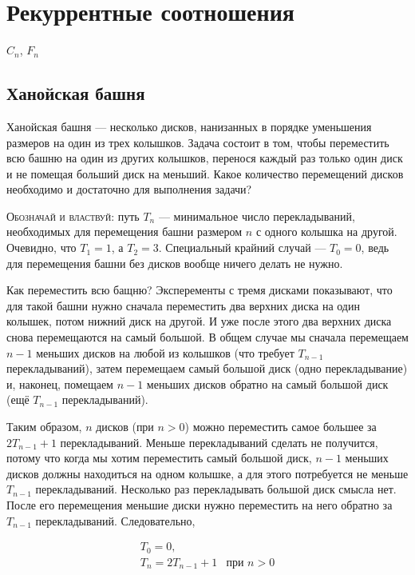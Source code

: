 \documentclass[14pt]{book}
\begin{document}
\begingroup
\hypersetup{linkcolor=black}
\tableofcontents
\endgroup

\clearpage

\chapter{Рекуррентные соотношения}

$C_n$, $F_n$

\section{Ханойская башня}

Ханойская башня --- несколько дисков, нанизанных в порядке уменьшения размеров на один из
трех колышков. Задача состоит в том, чтобы переместить всю башню на один из других колышков,
перенося каждый раз только один диск и не помещая больший диск на меньший.
Какое количество перемещений дисков необходимо и достаточно для выполнения задачи?

\textsc{Обозначай и властвуй}: путь $T_n$ --- минимальное число перекладываний, необходимых
для перемещения башни размером $n$ с одного колышка на другой. Очевидно, что $T_1=1$, а $T_2=3$.
Специальный крайний случай --- $T_0=0$, ведь для перемещения башни без дисков вообще ничего делать
не нужно.

Как переместить всю бащню? Эксперементы с тремя дисками показывают, что для такой башни нужно 
сначала переместить два верхних диска на один колышек, потом нижний диск на другой. И уже 
после этого два верхних диска снова перемещаются на самый большой. В общем случае мы сначала
перемещаем $n-1$ меньших дисков на любой из колышков (что требует $T_{n-1}$ перекладываний),
затем перемещаем самый большой диск (одно перекладывание) и, наконец, помещаем $n-1$
меньших дисков обратно на самый большой диск (ещё $T_{n-1}$ перекладываний). 

Таким образом, $n$ дисков (при $n>0$) можно переместить самое большее за $2T_{n-1}+1$
перекладываний. Меньше перекладываний сделать не получится, потому что когда мы хотим
переместить самый большой диск, $n-1$ меньших дисков должны находиться на одном колышке,
а для этого потребуется не меньше $T_{n-1}$ перекладываний.
Несколько раз перекладывать большой диск смысла нет. После его перемещения меньшие диски нужно
переместить на него обратно за $T_{n-1}$ перекладываний. Следовательно,

\begin{equation}
\label{formula-hanoi-rec}
\begin{array}{ll}
T_0 = 0, \\
T_n = 2T_{n-1} + 1 & \text{при } n > 0 \\
\end{array}
\end{equation}
\end{document}
